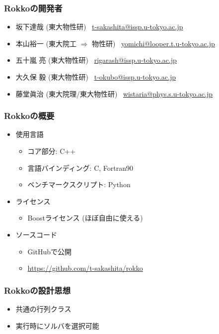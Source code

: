 \begin{frame}
  \frametitle{Rokkoの開発者}
  \begin{itemize}
    \setlength{\itemsep}{1em}
  \item 坂下達哉 (東大物性研) \ \href{mailto:t-sakashita@issp.u-tokyo.ac.jp}{t-sakashita@issp.u-tokyo.ac.jp}
  \item 本山裕一 (東大院工 $\Rightarrow $ 物性研) \ \href{mailto:yomichi@looper.u-tokyo.ac.jp}{yomichi@looper.t.u-tokyo.ac.jp}
  \item 五十嵐 亮 (東大物性研) \ \href{mailto:rigarash@issp.u-tokyo.ac.jp}{rigarash@issp.u-tokyo.ac.jp}
  \item 大久保 毅 (東大物性研) \ \href{mailto:t-okubo@issp.u-tokyo.ac.jp}{t-okubo@issp.u-tokyo.ac.jp}
  \item 藤堂眞治 (東大院理/東大物性研) \ \href{mailto:wistaria@phys.s.u-tokyo.ac.jp}{wistaria@phys.s.u-tokyo.ac.jp}
  \end{itemize}
\end{frame}

\begin{frame}
  \frametitle{Rokkoの概要}
  \begin{itemize}
  \item 使用言語
    \begin{itemize}
    \item コア部分: C++
    \item 言語バインディング: C, Fortran90
    \item ベンチマークスクリプト: Python
    \end{itemize}
  \item ライセンス
    \begin{itemize}
    \item Boostライセンス (ほぼ自由に使える)
    \end{itemize}
  \item ソースコード
    \begin{itemize}
    \item GitHubで公開
    \item \url{https://github.com/t-sakashita/rokko}
    \end{itemize}
  \end{itemize}
\end{frame}

\begin{frame}
  \frametitle{Rokkoの設計思想}
  \begin{itemize}
  \item 共通の行列クラス
  \item 実行時にソルバを選択可能
  \end{itemize}
\end{frame}

